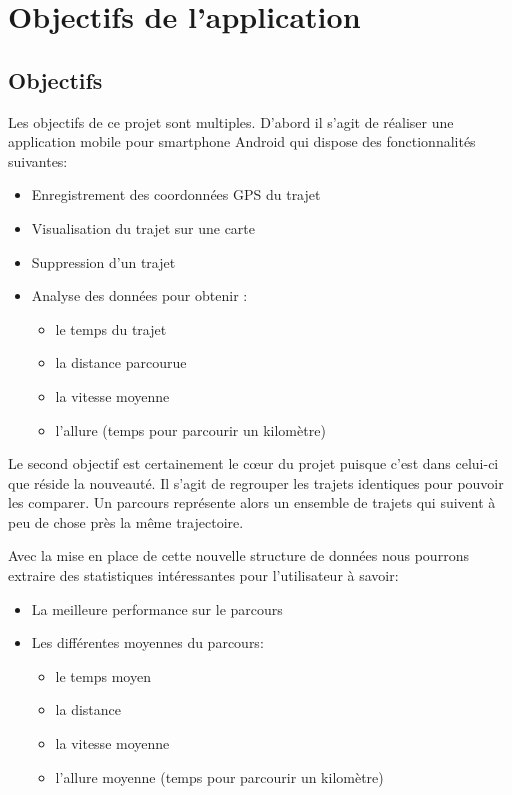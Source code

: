 \chapter{Objectifs de l'application}
\section{Objectifs}
Les objectifs de ce projet sont multiples. D'abord il s'agit de réaliser une application mobile pour smartphone Android qui dispose des fonctionnalités suivantes:\bigskip

\begin{itemize}
  \item Enregistrement des coordonnées GPS du trajet
  \item Visualisation du trajet sur une carte 
  \item Suppression d'un trajet 
  \item Analyse des données pour obtenir :
  \begin{itemize}
    \item le temps du trajet
    \item la distance parcourue
    \item la vitesse moyenne
    \item l'allure (temps pour parcourir un kilomètre)
  \end{itemize}
\end{itemize}\bigskip

Le second objectif est certainement le cœur du projet puisque c'est dans celui-ci que réside la nouveauté. Il s'agit de regrouper les trajets identiques pour pouvoir les comparer. Un parcours représente alors un ensemble de trajets qui suivent à peu de chose près la même trajectoire.\bigskip

Avec la mise en place de cette nouvelle structure de données nous pourrons extraire des statistiques intéressantes pour l'utilisateur à savoir:\bigskip

\begin{itemize}
  \item La meilleure performance sur le parcours
  \item Les différentes moyennes du parcours:
  \begin{itemize}
    \item le temps moyen
    \item la distance
    \item la vitesse moyenne
    \item l'allure moyenne (temps pour parcourir un kilomètre)
  \end{itemize}   
\end{itemize}\bigskip

